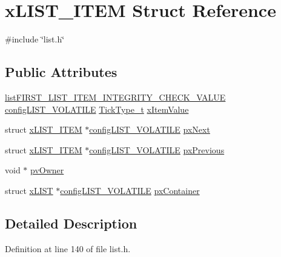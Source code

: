 \hypertarget{structxLIST__ITEM}{}\section{x\+L\+I\+S\+T\+\_\+\+I\+T\+EM Struct Reference}
\label{structxLIST__ITEM}


{\ttfamily \#include \char`\"{}list.\+h\char`\"{}}

\subsection*{Public Attributes}
\begin{DoxyCompactItemize}
\item 
\hyperlink{list_8h_a3611bd5d5d87cb26ac1dc7a4852b94a0}{list\+F\+I\+R\+S\+T\+\_\+\+L\+I\+S\+T\+\_\+\+I\+T\+E\+M\+\_\+\+I\+N\+T\+E\+G\+R\+I\+T\+Y\+\_\+\+C\+H\+E\+C\+K\+\_\+\+V\+A\+L\+UE} \hyperlink{list_8h_a2d5de557c5561c8980d1bf51d87d8cba}{config\+L\+I\+S\+T\+\_\+\+V\+O\+L\+A\+T\+I\+LE} \hyperlink{pic32mx_2portmacro_8h_aa69c48c6e902ce54f70886e6573c92a9}{Tick\+Type\+\_\+t} \hyperlink{structxLIST__ITEM_a9b1f26de79f9da1403ca3ebc7a2e653a}{x\+Item\+Value}
\item 
struct \hyperlink{structxLIST__ITEM}{x\+L\+I\+S\+T\+\_\+\+I\+T\+EM} $\ast$\hyperlink{list_8h_a2d5de557c5561c8980d1bf51d87d8cba}{config\+L\+I\+S\+T\+\_\+\+V\+O\+L\+A\+T\+I\+LE} \hyperlink{structxLIST__ITEM_a03713c4ee953ef5ca6adbec883720c60}{px\+Next}
\item 
struct \hyperlink{structxLIST__ITEM}{x\+L\+I\+S\+T\+\_\+\+I\+T\+EM} $\ast$\hyperlink{list_8h_a2d5de557c5561c8980d1bf51d87d8cba}{config\+L\+I\+S\+T\+\_\+\+V\+O\+L\+A\+T\+I\+LE} \hyperlink{structxLIST__ITEM_ae8e553eae41010a8e41c66d76c94110b}{px\+Previous}
\item 
void $\ast$ \hyperlink{structxLIST__ITEM_aeb3110b50fe0dbce826d929b27b5ddb1}{pv\+Owner}
\item 
struct \hyperlink{structxLIST}{x\+L\+I\+ST} $\ast$\hyperlink{list_8h_a2d5de557c5561c8980d1bf51d87d8cba}{config\+L\+I\+S\+T\+\_\+\+V\+O\+L\+A\+T\+I\+LE} \hyperlink{structxLIST__ITEM_afb1e27a88f6b064cd0216de08009844a}{px\+Container}
\end{DoxyCompactItemize}


\subsection{Detailed Description}


Definition at line 140 of file list.\+h.



